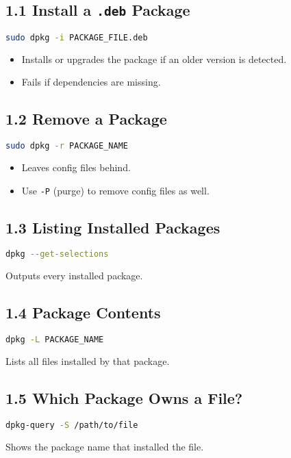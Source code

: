 \documentclass[12pt,a4paper]{report}
\begin{document}
\subsection*{1.1 Install a \texttt{.deb} Package}
\begin{lstlisting}[language=bash]
sudo dpkg -i PACKAGE_FILE.deb
\end{lstlisting}
\begin{itemize}
    \item Installs or upgrades the package if an older version is detected.  
    \item Fails if dependencies are missing.
\end{itemize}

\subsection*{1.2 Remove a Package}
\begin{lstlisting}[language=bash]
sudo dpkg -r PACKAGE_NAME
\end{lstlisting}
\begin{itemize}
    \item Leaves config files behind.  
    \item Use \texttt{-P} (purge) to remove config files as well.
\end{itemize}

\subsection*{1.3 Listing Installed Packages}
\begin{lstlisting}[language=bash]
dpkg --get-selections
\end{lstlisting}
Outputs every installed package.

\subsection*{1.4 Package Contents}
\begin{lstlisting}[language=bash]
dpkg -L PACKAGE_NAME
\end{lstlisting}
Lists all files installed by that package.

\subsection*{1.5 Which Package Owns a File?}
\begin{lstlisting}[language=bash]
dpkg-query -S /path/to/file
\end{lstlisting}
Shows the package name that installed the file.
\end{document}
